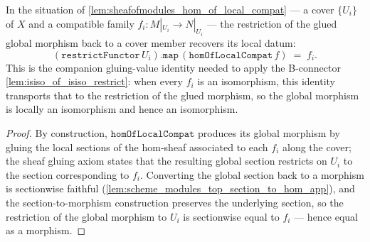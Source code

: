 \begin{lemma}



  \label{lem:hom_of_local_compat_restrict}
  In the situation of \cref{lem:sheafofmodules_hom_of_local_compat} --- a cover \(\{U_i\}\)
  of \(X\) and a compatible family \(f_i : M|_{U_i} \to N|_{U_i}\) --- the restriction of the
  glued global morphism back to a cover member recovers its local datum:
  \[
    (\mathtt{restrictFunctor}\,U_i).\mathtt{map}\,(\mathtt{homOfLocalCompat}\,f) \;=\; f_i .
  \]
  This is the companion gluing-value identity needed to apply the B-connector
  \cref{lem:isiso_of_isiso_restrict}: when every \(f_i\) is an isomorphism, this identity
  transports that to the restriction of the glued morphism, so the global morphism is
  locally an isomorphism and hence an isomorphism.
\end{lemma}
\begin{proof}



\leanok
  By construction, \(\mathtt{homOfLocalCompat}\) produces its global morphism by gluing
  the local sections of the hom-sheaf associated to each \(f_i\) along the cover; the sheaf
  gluing axiom states that the resulting global section restricts on \(U_i\) to the section
  corresponding to \(f_i\). Converting the global section back to a morphism is sectionwise
  faithful (\cref{lem:scheme_modules_top_section_to_hom_app}), and the section-to-morphism
  construction preserves the underlying section, so the restriction of the global morphism to
  \(U_i\) is sectionwise equal to \(f_i\) --- hence equal as a morphism.
\end{proof}

